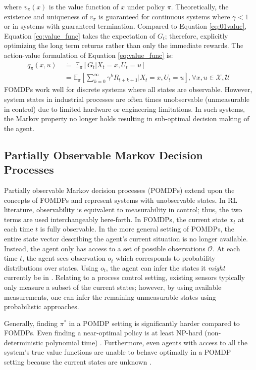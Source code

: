 where $v_\pi (x)$ is the value function of $x$ under policy $\pi$. Theoretically, the existence and uniqueness of $v_{\pi}$ is guaranteed for continuous systems where $\gamma < 1$ or in systems with guaranteed termination.  Compared to Equation \ref{eq:01value}, Equation \ref{eq:value_func} takes the expectation of $G_t$; therefore, explicitly optimizing the long term returns rather than only the immediate rewards. The action-value formulation of Equation \ref{eq:value_func} is:
\begin{align}
    q_\pi (x, u) \; &\dot{=} \; \mathbb{E}_\pi [G_t | X_t = x, U_t = u] \\
                 &= \mathbb{E}_\pi \left[\sum\limits^\infty_{k=0} \gamma^k R_{t+k+1} | X_t = x, U_t = u \right], \forall x, u \in \mathcal{X, U}
    \label{eq:a_value_func}
\end{align}
FOMDPs work well for discrete systems where all states are observable.  However, system states in industrial processes are often times unobservable (unmeasurable in control) due to limited hardware or engineering limitations. In such systems, the Markov property no longer holds resulting in sub-optimal decision making of the agent.





\subsection{Partially Observable Markov Decision Processes}
Partially observable Markov decision processes (POMDPs) extend upon the concepts of FOMDPs and represent systems with unobservable states. In RL literature, observability is equivalent to measurability in control; thus, the two terms are used interchangeably here-forth. In FOMDPs, the current state $x_t$ at each time $t$ is fully observable. In the more general setting of POMDPs, the entire state vector describing the agent's current situation is no longer available. Instead, the agent only has access to a set of possible observations $\mathcal{O}$. At each time $t$, the agent sees observation $o_t$ which corresponds to probability distributions over states.  Using $o_t$, the agent can infer the states it \textit{might} currently be in \cite{ng_ref12}. Relating to a process control setting, existing sensors typically only measure a subset of the current states; however, by using available measurements, one can infer the remaining unmeasurable states using probabilistic approaches.

Generally, finding $\pi^*$ in a POMDP setting is significantly harder compared to FOMDPs.  Even finding a near-optimal policy is at least NP-hard (non-deterministic polynomial time) \cite{pomdp_time}.  Furthermore, even agents with access to all the system's true value functions are unable to behave optimally in a POMDP setting because the current states are unknown \cite{ng_ref12}. 


